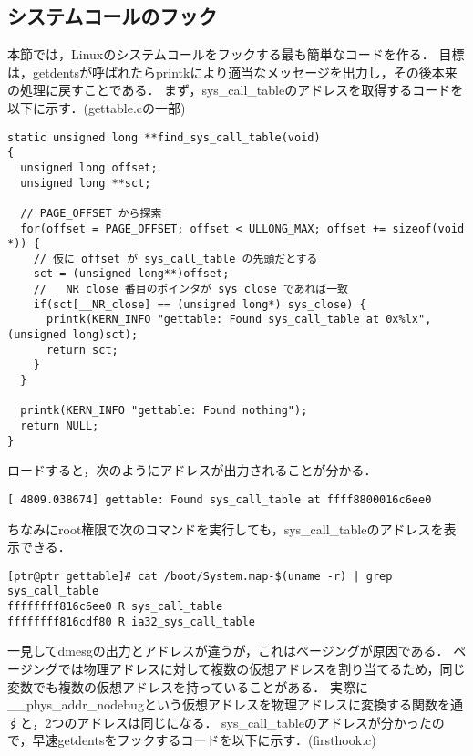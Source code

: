\documentclass{jsarticle}
\begin{document}
  \subsection{システムコールのフック}
  本節では，Linuxのシステムコールをフックする最も簡単なコードを作る．
  目標は，getdentsが呼ばれたらprintkにより適当なメッセージを出力し，その後本来の処理に戻すことである．
  まず，sys\_call\_tableのアドレスを取得するコードを以下に示す．(gettable.cの一部)
  \begin{lstlisting}[basicstyle=\ttfamily\footnotesize, frame=single]
static unsigned long **find_sys_call_table(void)
{
  unsigned long offset;
  unsigned long **sct;
  
  // PAGE_OFFSET から探索
  for(offset = PAGE_OFFSET; offset < ULLONG_MAX; offset += sizeof(void *)) {
    // 仮に offset が sys_call_table の先頭だとする
    sct = (unsigned long**)offset;
    // __NR_close 番目のポインタが sys_close であれば一致
    if(sct[__NR_close] == (unsigned long*) sys_close) {
      printk(KERN_INFO "gettable: Found sys_call_table at 0x%lx", (unsigned long)sct);
      return sct;
    }
  }
  
  printk(KERN_INFO "gettable: Found nothing");
  return NULL;
}
  \end{lstlisting}
  ロードすると，次のようにアドレスが出力されることが分かる．
  \begin{lstlisting}[basicstyle=\ttfamily\footnotesize, frame=single]
[ 4809.038674] gettable: Found sys_call_table at ffff8800016c6ee0
  \end{lstlisting}
  ちなみにroot権限で次のコマンドを実行しても，sys\_call\_tableのアドレスを表示できる．
  \begin{lstlisting}[basicstyle=\ttfamily\footnotesize, frame=single]
[ptr@ptr gettable]# cat /boot/System.map-$(uname -r) | grep sys_call_table
ffffffff816c6ee0 R sys_call_table
ffffffff816cdf80 R ia32_sys_call_table
  \end{lstlisting}
  一見してdmesgの出力とアドレスが違うが，これはページングが原因である．
  ページングでは物理アドレスに対して複数の仮想アドレスを割り当てるため，同じ変数でも複数の仮想アドレスを持っていることがある．
  実際に\_\_phys\_addr\_nodebugという仮想アドレスを物理アドレスに変換する関数を通すと，2つのアドレスは同じになる．
  sys\_call\_tableのアドレスが分かったので，早速getdentsをフックするコードを以下に示す．(firsthook.c)
\end{document}
